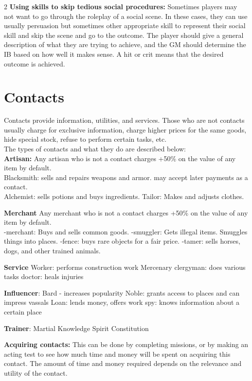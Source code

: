 \begin{multicols}{2}
\textbf{Using skills to skip tedious social procedures:} Sometimes players may not want to go through the roleplay of a social scene. In these cases, they can use usually persuasion but sometimes other appropriate skill to represent their social skill and skip the scene and go to the outcome. The player should give a general description of what they are trying to achieve, and the GM should determine the IB based on how well it makes sense. A hit or crit means that the desired outcome is achieved.

\section{Contacts}

Contacts provide information, utilities, and services. Those who are not contacts usually charge for exclusive information, charge higher prices for the same goods, hide special stock, refuse to perform certain tasks, etc.\\

The types of contacts and what they do are described below: \\

\textbf{Artisan:}
Any artisan who is not a contact charges +50\% on the value of any item by default. \\
Blacksmith: sells and repairs weapons and armor. may accept later payments as a contact. \\
Alchemist: sells potions and buys ingredients. 
Tailor: Makes and adjusts clothes. 

\textbf{Merchant}
Any merchant who is not a contact charges +50\% on the value of any item by default. \\
-merchant: Buys and sells common goods.
-smuggler: Gets illegal items. Smuggles things into places.
-fence: buys rare objects for a fair price.
-tamer: sells horses, dogs, and other trained animals.

\textbf{Service}
Worker: performs construction work
Mercenary
clergyman: does various tasks
doctor: heals injuries

\textbf{Influencer}:
Bard - increases popularity
Noble: grants access to places and can impress vassals
Loan: lends money, offers work
spy: knows information about a certain place

\textbf{Trainer}:
Martial
Knowledge
Spirit
Constitution

\textbf{Acquiring contacts:} This can be done by completing missions, or by making an acting test to see how much time and money will be spent on acquiring this contact. The amount of time and money required depends on the relevance and utility of the contact.


\end{multicols}
